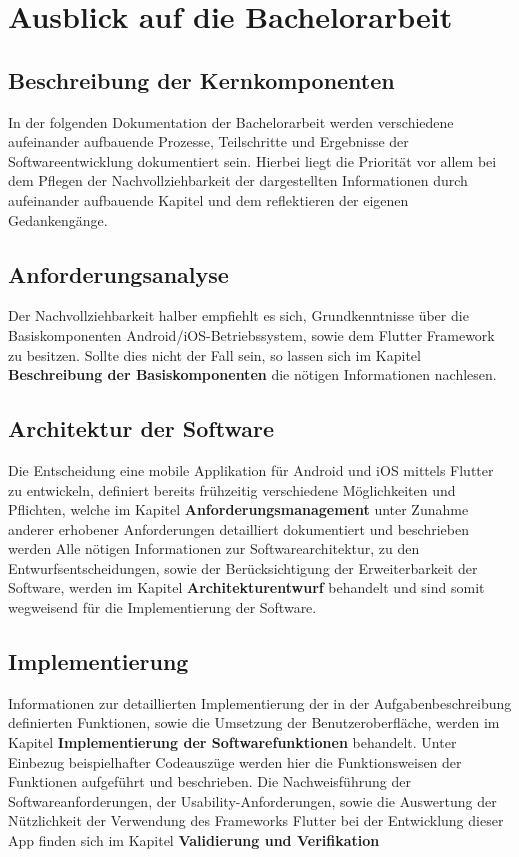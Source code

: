 \documentclass{scrreprt}
\begin{document}
\section{Ausblick auf die Bachelorarbeit}
\subsection{Beschreibung der Kernkomponenten}
In der folgenden Dokumentation der Bachelorarbeit werden verschiedene aufeinander aufbauende Prozesse, Teilschritte und Ergebnisse der Softwareentwicklung dokumentiert sein. Hierbei liegt die Priorität vor allem bei dem Pflegen der Nachvollziehbarkeit der dargestellten Informationen durch aufeinander aufbauende Kapitel und dem reflektieren der eigenen Gedankengänge.
\subsection{Anforderungsanalyse}
Der Nachvollziehbarkeit halber empfiehlt es sich, Grundkenntnisse über die Basiskomponenten Android/iOS-Betriebssystem, sowie dem Flutter Framework zu besitzen. Sollte dies nicht der Fall sein, so lassen sich im Kapitel \textbf{Beschreibung der Basiskomponenten} die nötigen Informationen nachlesen.
\subsection{Architektur der Software}
Die Entscheidung eine mobile Applikation für Android und iOS mittels Flutter zu entwickeln, definiert bereits frühzeitig verschiedene Möglichkeiten und Pflichten, welche im Kapitel \textbf{Anforderungsmanagement} unter Zunahme anderer erhobener Anforderungen detailliert dokumentiert und beschrieben werden
Alle nötigen Informationen zur Softwarearchitektur, zu den Entwurfsentscheidungen, sowie der Berücksichtigung der Erweiterbarkeit der Software, werden im Kapitel \textbf{Architekturentwurf} behandelt und sind somit wegweisend für die Implementierung der Software.
\subsection{Implementierung}
Informationen zur detaillierten Implementierung der in der Aufgabenbeschreibung definierten Funktionen, sowie die Umsetzung der Benutzeroberfläche, werden im Kapitel \textbf{Implementierung der Softwarefunktionen} behandelt. Unter Einbezug beispielhafter Codeauszüge werden hier die Funktionsweisen der Funktionen aufgeführt und beschrieben.
Die Nachweisführung der Softwareanforderungen, der Usability-Anforderungen, sowie die Auswertung der Nützlichkeit der Verwendung des Frameworks Flutter bei der Entwicklung dieser App finden sich im Kapitel \textbf{Validierung und Verifikation} 
\end{document}
